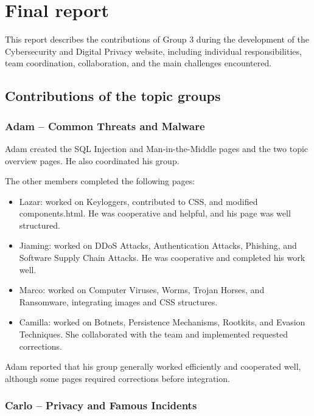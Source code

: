 \section{Final report}
\label{sec:finalreport}

This report describes the contributions of Group 3 during the development of the Cybersecurity and Digital Privacy website, including individual responsibilities, team coordination, collaboration, and the main challenges encountered.

\subsection{Contributions of the topic groups}
\label{sec:topicgroups}

\subsubsection{Adam -- Common Threats and Malware}
\label{sec:adam}

Adam created the SQL Injection and Man-in-the-Middle pages and the two topic overview pages. He also coordinated his group.

The other members completed the following pages:

\begin{itemize}
    \item Lazar: worked on Keyloggers, contributed to CSS, and modified components.html. He was cooperative and helpful, and his page was well structured.
    \item Jiaming: worked on DDoS Attacks, Authentication Attacks, Phishing, and Software Supply Chain Attacks. He was cooperative and completed his work well.
    \item Marco: worked on Computer Viruses, Worms, Trojan Horses, and Ransomware, integrating images and CSS structures.
    \item Camilla: worked on Botnets, Persistence Mechanisms, Rootkits, and Evasion Techniques. She collaborated with the team and implemented requested corrections.
\end{itemize}

Adam reported that his group generally worked efficiently and cooperated well, although some pages required corrections before integration.

\subsubsection{Carlo -- Privacy and Famous Incidents}
\label{sec:carlo}

